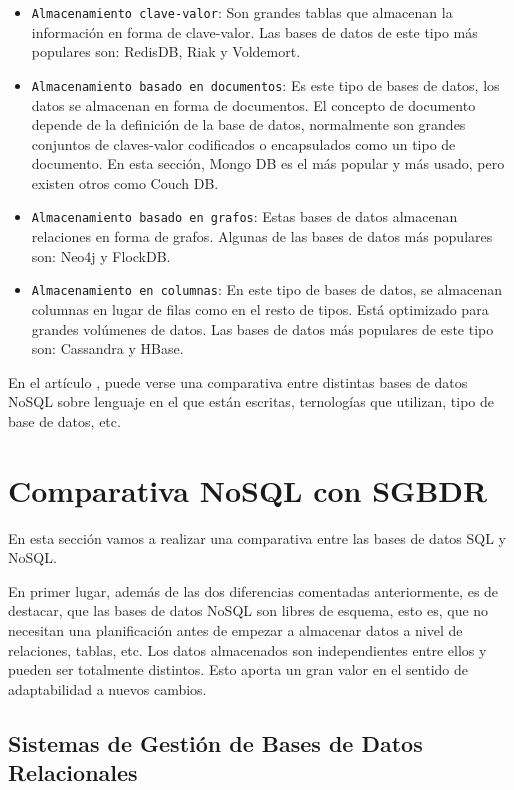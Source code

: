 \begin{itemize}
    \item \texttt{Almacenamiento clave-valor}: Son grandes tablas que almacenan la información en forma de clave-valor. Las bases de datos de este tipo más populares son: RedisDB, Riak y Voldemort.
    \item \texttt{Almacenamiento basado en documentos}: Es este tipo de bases de datos, los datos se almacenan en forma de documentos. El concepto de documento depende de la definición de la base de datos, normalmente son grandes conjuntos de claves-valor codificados o encapsulados como un tipo de documento. En esta sección, Mongo DB es el más popular y más usado, pero existen otros como Couch DB.
    \item \texttt{Almacenamiento basado en grafos}: Estas bases de datos almacenan relaciones en forma de grafos. Algunas de las bases de datos más populares son: Neo4j y FlockDB.
    \item \texttt{Almacenamiento en columnas}: En este tipo de bases de datos, se almacenan columnas en lugar de filas como en el resto de tipos. Está optimizado para grandes volúmenes de datos. Las bases de datos más populares de este tipo son: Cassandra y HBase. 
\end{itemize}

En el artículo \cite{nosqlcomparativas}, puede verse una comparativa entre distintas bases de datos NoSQL sobre lenguaje en el que están escritas, ternologías que utilizan, tipo de base de datos, etc.

\section{Comparativa NoSQL con SGBDR}

En esta sección vamos a realizar una comparativa entre las bases de datos SQL y NoSQL.

En primer lugar, además de las dos diferencias comentadas anteriormente, es de destacar, que las bases de datos NoSQL son libres de esquema, esto es, que no necesitan una planificación antes de empezar a almacenar datos a nivel de relaciones, tablas, etc. Los datos almacenados son independientes entre ellos y pueden ser totalmente distintos. Esto aporta un gran valor en el sentido de adaptabilidad a nuevos cambios.

\subsection{Sistemas de Gestión de Bases de Datos Relacionales}

